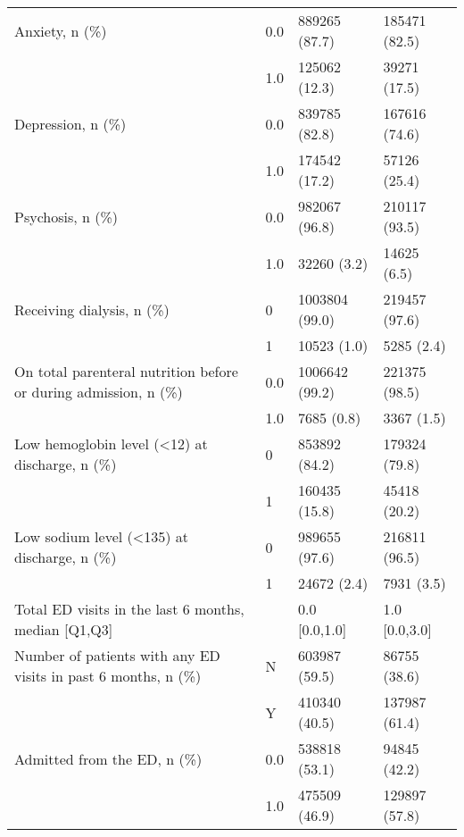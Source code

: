 \begin{tabular}{llll}
Anxiety, n (\%) & 0.0 &                  889265 (87.7) &     185471 (82.5) \\
                                       & 1.0 &                  125062 (12.3) &      39271 (17.5) \\
Depression, n (\%) & 0.0 &                  839785 (82.8) &     167616 (74.6) \\
                                       & 1.0 &                  174542 (17.2) &      57126 (25.4) \\
Psychosis, n (\%) & 0.0 &                  982067 (96.8) &     210117 (93.5) \\
                                       & 1.0 &                    32260 (3.2) &       14625 (6.5) \\
Receiving dialysis, n (\%) & 0 &                 1003804 (99.0) &     219457 (97.6) \\
                                       & 1 &                    10523 (1.0) &        5285 (2.4) \\
On total parenteral nutrition before or during admission, n (\%) & 0.0 &                 1006642 (99.2) &     221375 (98.5) \\
                                       & 1.0 &                     7685 (0.8) &        3367 (1.5) \\
Low hemoglobin level (<12) at discharge, n (\%) & 0 &                  853892 (84.2) &     179324 (79.8) \\
                                       & 1 &                  160435 (15.8) &      45418 (20.2) \\
Low sodium level (<135) at discharge, n (\%) & 0 &                  989655 (97.6) &     216811 (96.5) \\
                                       & 1 &                    24672 (2.4) &        7931 (3.5) \\
Total ED visits in the last 6 months, median [Q1,Q3] &   &                  0.0 [0.0,1.0] &     1.0 [0.0,3.0] \\
Number of patients with any ED visits in past 6 months, n (\%) & N &                  603987 (59.5) &      86755 (38.6) \\
                                       & Y &                  410340 (40.5) &     137987 (61.4) \\
Admitted from the ED, n (\%) & 0.0 &                  538818 (53.1) &      94845 (42.2) \\
                                       & 1.0 &                  475509 (46.9) &     129897 (57.8) \\

\end{tabular}
